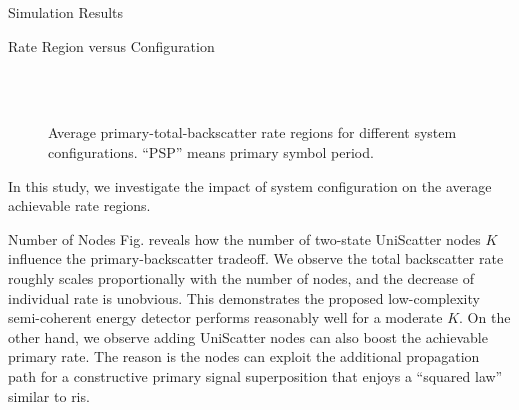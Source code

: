 \documentclass[journal]{IEEEtran}
\begin{document}
\begin{section}{Simulation Results}
	\begin{subsection}{Rate Region versus Configuration}
		\begin{figure}[!t]
			\centering
			\\
			\\
			\caption{
				Average primary-total-backscatter rate regions for different system configurations.
				``PSP'' means primary symbol period.
			}
			\label{fi:region_config}
		\end{figure}
		In this study, we investigate the impact of system configuration on the average achievable rate regions.
		\begin{subsubsection}{Number of Nodes}
			Fig.  reveals how the number of two-state UniScatter nodes $K$ influence the primary-backscatter tradeoff.
			We observe the total backscatter rate roughly scales proportionally with the number of nodes, and the decrease of individual rate is unobvious.
			This demonstrates the proposed low-complexity semi-coherent energy detector performs reasonably well for a moderate $K$.
			On the other hand, we observe adding UniScatter nodes can also boost the achievable primary rate.
			The reason is the nodes can exploit the additional propagation path for a constructive primary signal superposition that enjoys a ``squared law'' similar to \gls{ris}.
		\end{subsubsection}


\end{subsection}
\end{section}
\end{document}
